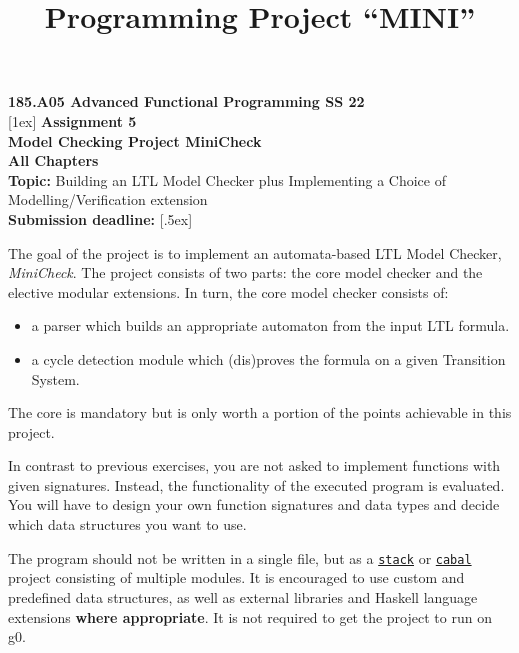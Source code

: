 \documentclass{article}
\title{Programming Project ``MINI''}
\begin{document}
\large
\thispagestyle{empty}
\begin{center}
  {\Large \textbf{185.A05 Advanced Functional Programming SS 22}}  \\ [1ex] 
              [1ex] 
               {\Large \textbf{Assignment 5}} \\[.5ex]
              {\Large \textbf{Model Checking Project MiniCheck}} \\[.5ex]
                 \textbf{All Chapters}  \\ [.75ex]
           \textbf{Topic:} Building an LTL Model Checker plus Implementing a Choice of Modelling/Verification extension  \\[1ex]
          \textbf{Submission deadline:}   [.5ex]
\end{center}

\vspace{1ex}
\noindent
\noindent





\newcommand{\code}[1]{\texttt{#1}}

\noindent
The goal of the project is to implement an automata-based LTL Model Checker, \textit{MiniCheck}. The project consists of two parts: 
the core model checker and the elective modular extensions. In turn, the core model checker consists of: 
\begin{itemize}
    \item a parser which builds an appropriate automaton from the input LTL formula.
    \item a cycle detection module which (dis)proves the formula on a given Transition System.
\end{itemize}  
The core is mandatory but is only worth a portion of the points achievable in this project.

In contrast to previous exercises, you are not asked to implement functions with given signatures. 
Instead, the functionality of the executed program is evaluated. 
You will have to design your own function signatures and data types and decide which data structures you want to use.

The program should not be written in a single file, but as a \href{https://docs.haskellstack.org/en/stable/README/}{\code{stack}} 
or \href{https://cabal.readthedocs.io/en/3.4/}{\code{cabal}} project consisting of multiple modules. 
It is encouraged to use custom and predefined data structures, as well as external libraries 
and Haskell language extensions \textbf{where appropriate}. It is not required to get the project to run on g0.
\end{document}
